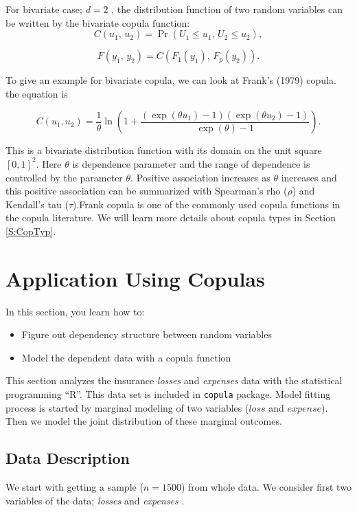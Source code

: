\documentclass[]{book}
\providecommand{\tightlist}{%
  \setlength{\itemsep}{0pt}\setlength{\parskip}{0pt}}
\theoremstyle{definition}
\theoremstyle{definition}
\theoremstyle{definition}
\theoremstyle{remark}
\begin{document}
For bivariate case; \(d=2\) , the distribution function of two random
variables can be written by the bivariate copula function:
\[{C}(u_1, \, u_2) = \Pr(U_1 \leq u_1, \, U_2 \leq
u_2),\]

\[{F}(y_1, \, y_2)= {C}({F}_1(y_1), \,
{F}_p(y_2)).\]

To give an example for bivariate copula, we can look at Frank's (1979)
copula. the equation is

\[{C}(u_1,u_2) = \frac{1}{\theta} \ln \left( 1+ \frac{ (\exp(\theta
u_1) -1)(\exp(\theta u_2) -1)} {\exp(\theta) -1} \right).\]

This is a bivariate distribution function with its domain on the unit
square \([0,1]^2.\) Here \(\theta\) is dependence parameter and the
range of dependence is controlled by the parameter \(\theta\). Positive
association increases as \(\theta\) increases and this positive
association can be summarized with Spearman's rho (\(\rho\)) and
Kendall's tau (\(\tau\)).Frank copula is one of the commonly used copula
functions in the copula literature. We will learn more details about
copula types in Section \ref{S:CopTyp}.

\section{Application Using Copulas}\label{S:CopAppl}

In this section, you learn how to:

\begin{itemize}
\tightlist
\item
  Figure out dependency structure between random variables
\item
  Model the dependent data with a copula function
\end{itemize}

This section analyzes the insurance \emph{losses } and \emph{expenses }
data with the statistical programming ``R''. This data set is included
in \texttt{copula} package. Model fitting process is started by marginal
modeling of two variables (\(loss\) and \(expense\)). Then we model the
joint distribution of these marginal outcomes.

\subsection{Data Description}\label{data-description}

We start with getting a sample (\(n = 1500\)) from whole data. We
consider first two variables of the data; \emph{losses } and
\emph{expenses }.
\end{document}
